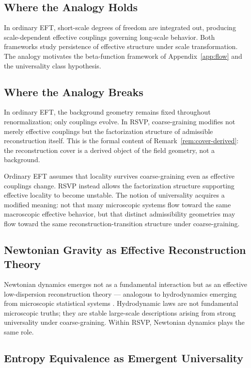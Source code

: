 \documentclass[11pt, a4paper]{article}
\theoremstyle{plain}
\theoremstyle{definition}
\theoremstyle{remark}
\begin{document}
\subsection{Where the Analogy Holds}

In ordinary EFT, short-scale degrees of freedom are integrated out, producing
scale-dependent effective couplings governing long-scale behavior. Both frameworks
study persistence of effective structure under scale transformation. The analogy
motivates the beta-function framework of Appendix~\ref{app:flow} and the universality
class hypothesis.

\subsection{Where the Analogy Breaks}

In ordinary EFT, the background geometry remains fixed throughout renormalization;
only couplings evolve. In RSVP, coarse-graining modifies not merely effective
couplings but the factorization structure of admissible reconstruction itself. This
is the formal content of Remark~\ref{rem:cover-derived}: the reconstruction cover is
a derived object of the field geometry, not a background.

Ordinary EFT assumes that locality survives coarse-graining even as effective
couplings change. RSVP instead allows the factorization structure supporting effective
locality to become unstable. The notion of universality acquires a modified meaning:
not that many microscopic systems flow toward the same macroscopic effective
behavior, but that distinct admissibility geometries may flow toward the same
reconstruction-transition structure under coarse-graining.

\subsection{Newtonian Gravity as Effective Reconstruction Theory}

Newtonian dynamics emerges not as a fundamental interaction but as an effective
low-dispersion reconstruction theory --- analogous to hydrodynamics emerging from
microscopic statistical systems \cite{goldenfeld1992}. Hydrodynamic laws are not
fundamental microscopic truths; they are stable large-scale descriptions arising from
strong universality under coarse-graining. Within RSVP, Newtonian dynamics plays the
same role.

\subsection{Entropy Equivalence as Emergent Universality}
\end{document}
